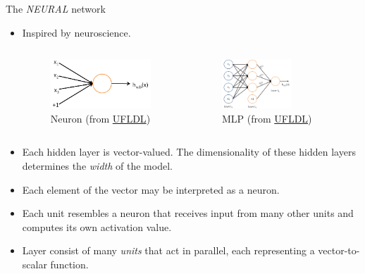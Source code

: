 \documentclass[10pt]{beamer}
\begin{document}
	\begin{frame}{The \emph{NEURAL} network}
		\begin{itemize}
			\item Inspired by neuroscience.
			\begin{columns}
				\begin{figure}
					\includegraphics<3->[height=5em]{figures/neuron.png}
					\caption{Neuron (from \href{http://deeplearning.stanford.edu/wiki/index.php/File:SingleNeuron.png}{UFLDL})}
				\end{figure}
			
				\begin{figure}
					\includegraphics<3->[height=5em]{figures/multilayer-perceptron.png}
					\caption{MLP (from \href{http://ufldl.stanford.edu/wiki/index.php/File:Network331.png}{UFLDL})}
				\end{figure}
					
			\end{columns}
			\item Each hidden layer is vector-valued. The dimensionality of these hidden layers determines the \emph{width} of the model.
			\onslide<5->
			\item Each element of the vector may be interpreted as a neuron.
			\onslide<6->
			\item Each unit resembles a neuron that receives input from many other units and computes its own activation value.
			\onslide<7->
			\item Layer consist of many \emph{units} that act in parallel, each representing a vector-to-scalar function.

		\end{itemize}
	\end{frame}
\end{document}
